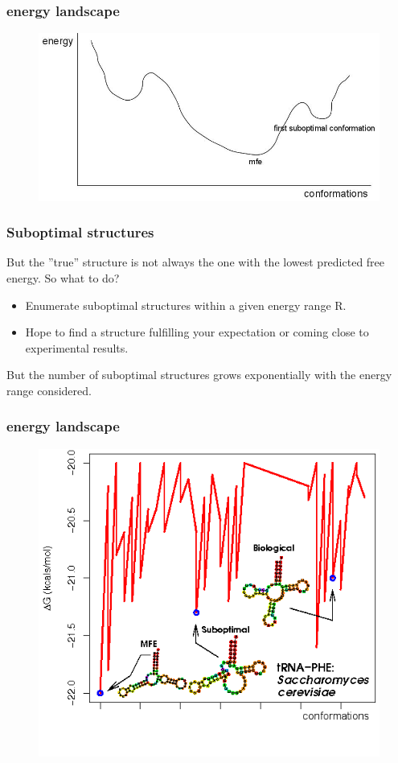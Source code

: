 \documentclass[ignorenonframetext,10pt]{beamer}
\begin{document}
\begin{frame}
\frametitle{energy landscape}
\begin{figure}
  \includegraphics[scale=0.4]{images/energy_landscape_simple.jpg}
\end{figure}
\end{frame}


\begin{frame}
\frametitle{Suboptimal structures}
    But the ''true'' structure is not always the one with the lowest
    predicted free energy.
    So what to do?
    \begin{itemize} 
    \item Enumerate suboptimal structures within a given energy range R.
    \item Hope to find a structure fulfilling your expectation or coming close
    to experimental results.
    \end{itemize}
    But the number of suboptimal structures grows exponentially with the energy
    range considered.
\end{frame}


\begin{frame}
\frametitle{energy landscape}  
\begin{figure}
  \includegraphics[scale=0.5]{images/Yeast.png} 
\end{figure}
\end{frame}
\end{document}

